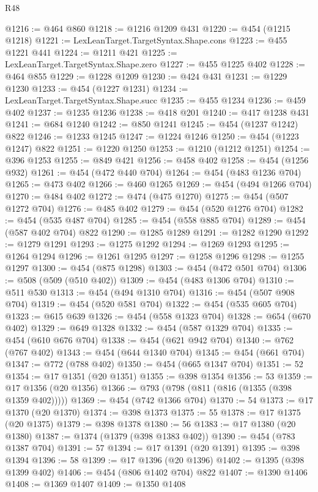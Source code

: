 \begin{lexlean}{R48}
\begin{coremodule}
@1216 := @464 @860
@1218 := @1216 @1209 @431
@1220 := @454 (@1215 @1218)
@1221 := LexLeanTarget.TargetSyntax.Shape.cons
@1223 := @455 @1221 @441
@1224 := @1211 @421
@1225 := LexLeanTarget.TargetSyntax.Shape.zero
@1227 := @455 @1225 @402
@1228 := @464 @855
@1229 := @1228 @1209
@1230 := @424 @431
@1231 := @1229 @1230
@1233 := @454 (@1227 @1231)
@1234 := LexLeanTarget.TargetSyntax.Shape.succ
@1235 := @455 @1234
@1236 := @459 @402
@1237 := @1235 @1236
@1238 := @418 @201
@1240 := @417 @1238 @431
@1241 := @684 @1240
@1242 := @850 @1241
@1245 := @454 (@1237 @1242) @822
@1246 := @1233 @1245
@1247 := @1224 @1246
@1250 := @454 (@1223 @1247) @822
@1251 := @1220 @1250
@1253 := @1210 (@1212 @1251)
@1254 := @396 @1253
@1255 := @849 @421
@1256 := @458 @402
@1258 := @454 (@1256 @932)
@1261 := @454 (@472 @440 @704)
@1264 := @454 (@483 @1236 @704)
@1265 := @473 @402
@1266 := @460 @1265
@1269 := @454 (@494 @1266 @704)
@1270 := @484 @402
@1272 := @474 (@475 @1270)
@1275 := @454 (@507 @1272 @704)
@1276 := @485 @402
@1279 := @454 (@520 @1276 @704)
@1282 := @454 (@535 @487 @704)
@1285 := @454 (@558 @885 @704)
@1289 := @454 (@587 @402 @704) @822
@1290 := @1285 @1289
@1291 := @1282 @1290
@1292 := @1279 @1291
@1293 := @1275 @1292
@1294 := @1269 @1293
@1295 := @1264 @1294
@1296 := @1261 @1295
@1297 := @1258 @1296
@1298 := @1255 @1297
@1300 := @454 (@875 @1298)
@1303 := @454 (@472 @501 @704)
@1306 := @508 (@509 (@510 @402))
@1309 := @454 (@483 @1306 @704)
@1310 := @511 @530
@1313 := @454 (@494 @1310 @704)
@1316 := @454 (@507 @908 @704)
@1319 := @454 (@520 @581 @704)
@1322 := @454 (@535 @605 @704)
@1323 := @615 @639
@1326 := @454 (@558 @1323 @704)
@1328 := @654 (@670 @402)
@1329 := @649 @1328
@1332 := @454 (@587 @1329 @704)
@1335 := @454 (@610 @676 @704)
@1338 := @454 (@621 @942 @704)
@1340 := @762 (@767 @402)
@1343 := @454 (@644 @1340 @704)
@1345 := @454 (@661 @704)
@1347 := @772 (@788 @402)
@1350 := @454 (@665 @1347 @704)
@1351 := 52
@1354 := @17 @1351 (@20 @1351)
@1355 := @398 @1354
@1356 := 53
@1359 := @17 @1356 (@20 @1356)
@1366 := @793 (@798 (@811 (@816 (@1355 (@398 @1359 @402)))))
@1369 := @454 (@742 @1366 @704)
@1370 := 54
@1373 := @17 @1370 (@20 @1370)
@1374 := @398 @1373
@1375 := 55
@1378 := @17 @1375 (@20 @1375)
@1379 := @398 @1378
@1380 := 56
@1383 := @17 @1380 (@20 @1380)
@1387 := @1374 (@1379 (@398 @1383 @402))
@1390 := @454 (@783 @1387 @704)
@1391 := 57
@1394 := @17 @1391 (@20 @1391)
@1395 := @398 @1394
@1396 := 58
@1399 := @17 @1396 (@20 @1396)
@1402 := @1395 (@398 @1399 @402)
@1406 := @454 (@806 @1402 @704) @822
@1407 := @1390 @1406
@1408 := @1369 @1407
@1409 := @1350 @1408

\end{coremodule}
\end{lexlean}
